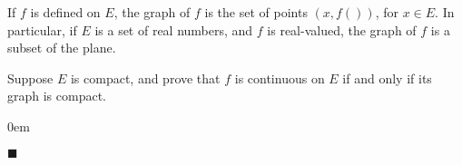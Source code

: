 \documentclass[12pt]{article}
\renewcommand{\qed}{\hfill$\blacksquare$}
\renewenvironment{proof}{\begin{addmargin}[1em]{0em}\begin{newproof}}{\end{newproof}\end{addmargin}\qed}
\newenvironment{problem}[2][Exercise]{\begin{trivlist}
\item[\hskip \labelsep {\bfseries #1}\hskip \labelsep {\bfseries #2.}]}{\end{trivlist}}
\begin{document}
\begin{problem}{4.6}
If $f$ is defined on $E$, the graph of $f$ is the set of points $\left(x,f\left(\right)\right)$, for $x\in E$. In particular, if $E$ is a set of real numbers, and $f$ is real-valued, the graph of $f$ is a subset of the plane.

Suppose $E$ is compact, and prove that $f$ is continuous on $E$ if and only if its graph is compact.
\end{problem}
\begin{proof}

\end{proof}




















\end{document}
